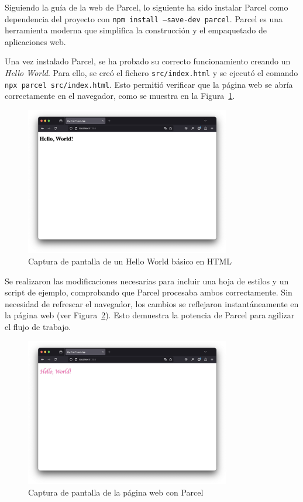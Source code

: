 \documentclass{article}
\begin{document}
Siguiendo la guía de la web de Parcel, lo siguiente ha sido instalar Parcel como dependencia del proyecto con \texttt{npm install --save-dev parcel}. Parcel es una herramienta moderna que simplifica la construcción y el empaquetado de aplicaciones web.

Una vez instalado Parcel, se ha probado su correcto funcionamiento creando un \textit{Hello World}. Para ello, se creó el fichero \texttt{src/index.html} y se ejecutó el comando \texttt{npx parcel src/index.html}. Esto permitió verificar que la página web se abría correctamente en el navegador, como se muestra en la Figura~\ref{fig:hello-world}.

 \begin{figure}[h!]
     \centering
     \includegraphics[width=0.8\textwidth]{./img/hello-world}
     \caption{Captura de pantalla de un Hello World básico en HTML}
     \label{fig:hello-world}
 \end{figure}

Se realizaron las modificaciones necesarias para incluir una hoja de estilos y un script de ejemplo, comprobando que Parcel procesaba ambos correctamente. Sin necesidad de refrescar el navegador, los cambios se reflejaron instantáneamente en la página web (ver Figura~\ref{fig:parcel}). Esto demuestra la potencia de Parcel para agilizar el flujo de trabajo.

 \begin{figure}[h!]
     \centering
     \includegraphics[width=0.8\textwidth]{./img/hello-world-styled}
     \caption{Captura de pantalla de la página web con Parcel}
     \label{fig:parcel}
 \end{figure}
\end{document}
